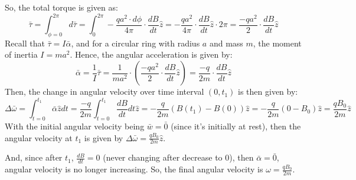 \documentclass{article}
\begin{document}
So, the total torque is given as:
$$\bar{\tau}=\int_{\phi=0}^{2\pi}d\bar{\tau}=\int_{0}^{2\pi}-\frac{qa^2\cdot d\phi}{4\pi}\cdot \frac{dB}{dt}\hat{z} = -\frac{qa^2}{4\pi}\cdot \frac{dB}{dt}\hat{z} \cdot 2\pi = \frac{-qa^2}{2}\cdot \frac{dB}{dt}\hat{z}$$
Recall that $\bar{\tau} = I\bar{\alpha}$, and for a circular ring with radius $a$ and mass $m$, the moment of inertia $I=ma^2$. Hence, the angular acceleration is given by:
$$\bar{\alpha}=\frac{1}{I}\bar{\tau} = \frac{1}{ma^2}\cdot \left(\frac{-qa^2}{2}\cdot \frac{dB}{dt}\hat{z}\right) = \frac{-q}{2m}\cdot \frac{dB}{dt}\hat{z}$$
Then, the change in angular velocity over time interval $(0,t_1)$ is then given by:
$$\Delta\bar{\omega}=\int_{t=0}^{t_1}\bar{\alpha}\hat{z} dt = \frac{-q}{2m}\int_{t=0}^{t_1}\frac{dB}{dt} dt \hat{z} = -\frac{q}{2m}(B(t_1)-B(0))\hat{z} = -\frac{q}{2m}(0-B_0)\hat{z} = \frac{qB_0}{2m}\hat{z}$$
With the initial angular velocity being $\bar{w}=\bar{0}$ (since it's initially at rest), then the angular velocity at $t_1$ is given by $\Delta\bar{\omega} = \frac{qB_0}{2m}\hat{z}$.

And, since after $t_1$, $\frac{dB}{dt}=0$ (never changing after decrease to $0$), then $\bar{\alpha}=\bar{0}$, angular velocity is no longer increasing.
So, the final angular velocity is $\omega = \frac{qB_0}{2m}$.
\end{document}
